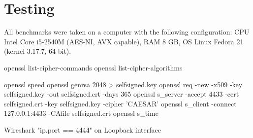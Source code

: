 \section{Testing}


All benchmarks were taken on a computer with the following configuration: CPU Intel Core i5-2540M (AES-NI, AVX capable), RAM 8 GB, OS Linux Fedora 21 (kernel 3.17.7, 64 bit).

openssl list-cipher-commands
openssl list-cipher-algorithms

openssl speed
openssl genrsa 2048 > selfsigned.key
openssl req -new -x509 -key selfsigned.key -out selfsigned.crt -days 365
openssl s\_server -accept 4433 -cert selfsigned.crt -key selfsigned.key -cipher 'CAESAR'
openssl s\_client -connect 127.0.0.1:4433 -CAfile selfsigned.crt
openssl s\_time

Wireshark "ip.port == 4444" on Loopback interface
